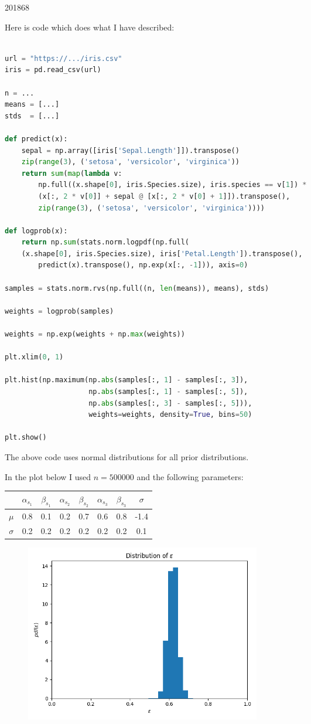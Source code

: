 \documentclass[10pt,\jkfside,a4paper]{article}
\begin{document}
\begin{examquestion}{2018}{6}{8}
\begin{enumerate}[label=(\alph*)]
Here is code which does what I have described:

\begin{lstlisting}[language=Python]

url = "https://.../iris.csv"
iris = pd.read_csv(url)

n = ...
means = [...]
stds  = [...]

def predict(x):
	sepal = np.array([iris['Sepal.Length']]).transpose()
	zip(range(3), ('setosa', 'versicolor', 'virginica'))
	return sum(map(lambda v:
		np.full((x.shape[0], iris.Species.size), iris.species == v[1]) *
		(x[:, 2 * v[0]] + sepal @ [x[:, 2 * v[0] + 1]]).transpose(),
		zip(range(3), ('setosa', 'versicolor', 'virginica'))))

def logprob(x):
	return np.sum(stats.norm.logpdf(np.full(
	(x.shape[0], iris.Species.size), iris['Petal.Length']).transpose(),
        predict(x).transpose(), np.exp(x[:, -1])), axis=0)

samples = stats.norm.rvs(np.full((n, len(means)), means), stds)

weights = logprob(samples)

weights = np.exp(weights + np.max(weights))

plt.xlim(0, 1)

plt.hist(np.maximum(np.abs(samples[:, 1] - samples[:, 3]),
                    np.abs(samples[:, 1] - samples[:, 5]),
                    np.abs(samples[:, 3] - samples[:, 5])),
                    weights=weights, density=True, bins=50)

plt.show()

\end{lstlisting}

The above code uses normal distributions for all prior distributions.

In the plot below I used $n=500000$ and the following parameters:
\begin{table}[H]
\centering
\begin{tabular}{c|c|c|c|c|c|c|c}
& $\alpha_{s_1}$ & $\beta_{s_1}$ & $\alpha_{s_2}$ & $\beta_{s_2}$ &
$\alpha_{s_3}$ & $\beta_{s_3}$ & $\sigma$ \\
\hline
$\mu$ & 0.8 & 0.1 & 0.2 & 0.7 & 0.6 & 0.8 & -1.4 \\
$\sigma$ & 0.2 & 0.2 & 0.2 & 0.2 & 0.2 & 0.2 & 0.1 \\
\end{tabular}
\end{table}

\begin{figure}[H]
    \centering
    \includegraphics[width=0.5\textwidth]{./distribution_of_epsilon}
\end{figure}


\end{enumerate}
\end{examquestion}
\end{document}
